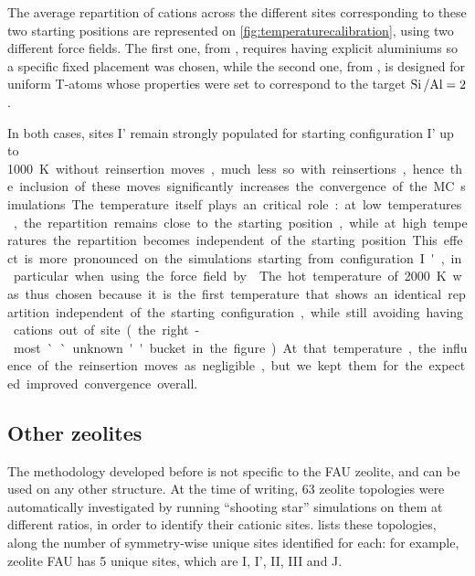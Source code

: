 \documentclass[main.tex]{subfiles}
\begin{document}
The average repartition of cations across the different sites corresponding to these two starting positions are represented on \cref{fig:temperaturecalibration}, using two different force fields. The first one, from \textcite{BoulfelfelSholl2021}, requires having explicit aluminiums so a specific fixed placement was chosen, while the second one, from \textcite{DiLellaFF}, is designed for uniform T-atoms whose properties were set to correspond to the target $\mbox{Si\,/Al} = 2$.

In both cases, sites I' remain strongly populated for starting configuration I' up to \qty{1000}K without reinsertion moves, much less so with reinsertions, hence the inclusion of these moves significantly increases the convergence of the MC simulations.

The temperature itself plays an critical role: at low temperatures, the repartition remains close to the starting position, while at high temperatures the repartition becomes independent of the starting position. This effect is more pronounced on the simulations starting from configuration I', in particular when using the force field by \textcite{DiLellaFF}. The hot temperature of \qty{2000}K was thus chosen because it is the first temperature that shows an identical repartition independent of the starting configuration, while still avoiding having cations out of site (the right-most ``unknown'' bucket in the figure). At that temperature, the influence of the reinsertion moves as negligible, but we kept them for the expected improved convergence overall.


\subsection{Other zeolites}

The methodology developed before is not specific to the FAU zeolite, and can be used on any other structure. At the time of writing, 63 zeolite topologies were automatically investigated by running ``shooting star'' simulations on them at different \SiAl ratios, in order to identify their cationic sites.  lists these topologies, along the number of symmetry-wise unique sites identified for each: for example, zeolite FAU has 5 unique sites, which are I, I', II, III and J.
\end{document}
